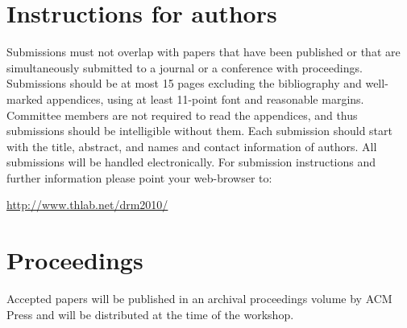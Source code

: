 \documentclass{article}
\begin{document}
\begin{tabularx}{\linewidth}
  \section*{Instructions for authors}

  Submissions must not overlap with papers that have been published or
  that are simultaneously submitted to a journal or a conference with
  proceedings. Submissions should be at most 15 pages excluding the
  bibliography and well-marked appendices, using at least 11-point
  font and reasonable margins. Committee members are not required to
  read the appendices, and thus submissions should be intelligible
  without them. Each submission should start with the title, abstract,
  and names and contact information of authors. All submissions will
  be handled electronically.  For submission instructions and further
  information please point your web-browser to:
  \begin{center}
    \url{http://www.thlab.net/drm2010/}
  \end{center}\par\smallskip
  
  \section*{Proceedings}

  Accepted papers will be published in an archival proceedings volume
  by ACM Press and will be distributed at the time of the workshop.
\end{tabularx}
\end{document}
